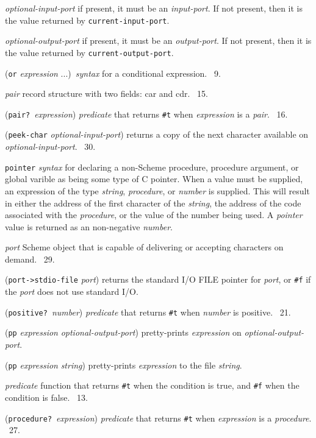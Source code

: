 \documentclass[10pt,twocolumn]{article}
\begin{document}
\emph{optional-input-port} if present, it must be an
\emph{input-port}.  If not present, then it is the value returned by
\texttt{current-input-port}.

\emph{optional-output-port} if present, it must be an
\emph{output-port}.  If not present, then it is the value returned by
\texttt{current-output-port}.

(\texttt{or} \emph{expression} ...)\ \emph{syntax} for a conditional
expression.  \RRRRRS~9.

\emph{pair} record structure with two fields: car and cdr.
\RRRRRS~15.

(\texttt{pair?}\ \emph{expression}) \emph{predicate} that returns
\texttt{\#t} when \emph{expression} is a \emph{pair}.  \RRRRRS~16.

(\texttt{peek-char} \emph{optional-input-port}) returns a copy of the
next character available on \emph{optional-input-port}.  \RRRRRS~30.

\texttt{pointer} \emph{syntax} for declaring a non-Scheme procedure,
procedure argument, or global varible as being some type of C pointer.
When a value must be supplied, an expression of the type
\emph{string}, \emph{procedure}, or \emph{number} is supplied.  This
will result in either the address of the first character of the
\emph{string}, the address of the code associated with the
\emph{procedure}, or the value of the number being used.  A
\emph{pointer} value is returned as an non-negative \emph{number}.

\emph{port} Scheme object that is capable of delivering or accepting
characters on demand.  \RRRRRS~29.

(\texttt{port->stdio-file} \emph{port}) returns the standard I/O FILE
pointer for \emph{port}, or \texttt{\#f} if the \emph{port} does not
use standard I/O.

(\texttt{positive?}\ \emph{number}) \emph{predicate} that returns
\texttt{\#t} when \emph{number} is positive.  \RRRRRS~21.

(\texttt{pp} \emph{expression} \emph{optional-output-port})
pretty-prints \emph{expression} on \emph{optional-output-port}.

(\texttt{pp} \emph{expression} \emph{string}) pretty-prints
\emph{expression} to the file \emph{string}.

\emph{predicate} function that returns \texttt{\#t} when the condition
is true, and \texttt{\#f} when the condition is false.  \RRRRRS~13.

(\texttt{procedure?}\ \emph{expression}) \emph{predicate} that returns
\texttt{\#t} when \emph{expression} is a \emph{procedure}.
\RRRRRS~27.
\end{document}
